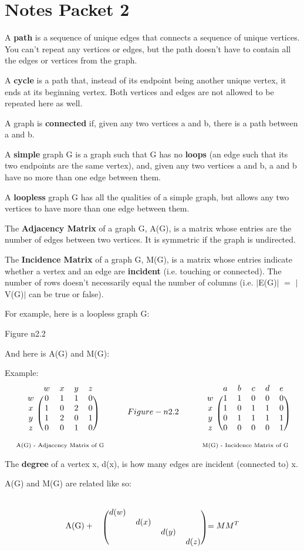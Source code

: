 \documentclass{article}
\newcommand{\mt}[1]{\ensuremath{#1}}
\newcommand\bsc[2][\DefaultOpt]{%
  \def\DefaultOpt{#2}%
  \section[#1]{#2}%
}
\newcommand{\av}[1]{\mt{|}#1\mt{|}}  %
\newcommand{\eql}{ \mt{\operatorname{=}} }
\newcommand{\eqn}[1]{\[#1\]}
\newcommand\tab[1][1cm]{\hspace*{#1}}
\newcommand{\lbm}[4]{
	  \begin{blockarray}{#1} %
        #2 \\ %
      \begin{block}{c(#3)} %
        #4 %
      \end{block}
    \end{blockarray}
}
\begin{document}
\bsc{Notes Packet 2}{

A \textbf{path} is a sequence of unique edges that connects a sequence of unique vertices. You can't repeat any vertices or edges, but the path doesn't have to contain all the edges or vertices from the graph.

A \textbf{cycle} is a path that, instead of its endpoint being another unique vertex, it ends at its beginning vertex. Both vertices and edges are not allowed to be repeated here as well.

A graph is \textbf{connected} if, given any two vertices a and b, there is a path between a and b.

A \textbf{simple} graph G is a graph such that G has no \textbf{loops} (an edge such that its two endpoints are the same vertex), and, given any two vertices a and b, a and b have no more than one edge between them.

A \textbf{loopless} graph G has all the qualities of a simple graph, but allows any two vertices to have more than one edge between them.

The \textbf{Adjacency Matrix} of a graph G, A(G), is a matrix whose entries are the number of edges between two vertices. It is symmetric if the graph is undirected.

The \textbf{Incidence Matrix} of a graph G, M(G), is a matrix whose entries indicate whether a vertex and an edge are \textbf{incident} (i.e. touching or connected). The number of rows doesn't necessarily equal the number of columns (i.e. \av{E(G)} \eql \av{V(G)} can be true or false).

For example, here is a loopless graph G:

Figure n2.2

And here is A(G) and M(G):

Example:
\[\underset{\textrm{A(G) - Adjacency Matrix of G}}{\lbm{ccccc}{
  & w & x & y & z}{cccc}
{w & 0 & 1 & 1 & 0 \\
 x & 1 & 0 & 2 & 0 \\
 y & 1 & 2 & 0 & 1 \\
 z & 0 & 0 & 1 & 0 \\}}
 \tab
Figure-n2.2
 \tab
\underset{\textrm{M(G) - Incidence Matrix of G}}{\lbm{cccccc}{
 & a & b & c & d & e}{ccccc}{
 w & 1 & 1 & 0 & 0 & 0 \\
 x & 1 & 0 & 1 & 1 & 0 \\
 y & 0 & 1 & 1 & 1 & 1 \\
 z & 0 & 0 & 0 & 0 & 1 \\}}\]

The \textbf{degree} of a vertex x, d(x), is how many edges are incident (connected to) x.

A(G) and M(G) are related like so:

\eqn{\textrm{A(G)} + \lbm{ccccc}{
  &  &  &  & }{cccc}
{ & d(w) &  &  &  \\
  &  & d(x) &  &  \\
  &  &  & d(y) &  \\
  &  &  &  & d(z) \\} = MM^T}
}
\end{document}
